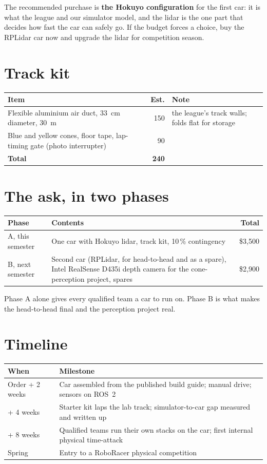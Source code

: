 \documentclass[11pt,a4paper]{article}
\begin{document}
\medskip
The recommended purchase is \textbf{the Hokuyo configuration} for the first car: it is what
the league and our simulator model, and the lidar is the one part that decides how fast the
car can safely go. If the budget forces a choice, buy the RPLidar car now and upgrade the lidar
for competition season.

\section{Track kit}

\begin{tabularx}{\linewidth}{Xrl}
\toprule
Item & Est. & Note \\
\midrule
Flexible aluminium air duct, 33~cm diameter, 30~m & 150 & the league's track walls; folds flat for storage \\
Blue and yellow cones, floor tape, lap-timing gate (photo interrupter) & 90 & \\
\midrule
\textbf{Total} & \textbf{240} & \\
\bottomrule
\end{tabularx}

\section{The ask, in two phases}

\begin{tabularx}{\linewidth}{lXr}
\toprule
Phase & Contents & Total \\
\midrule
A, this semester & One car with Hokuyo lidar, track kit, 10\,\% contingency & \$3{,}500 \\
B, next semester & Second car (RPLidar, for head-to-head and as a spare), Intel RealSense D435i depth camera for the cone-perception project, spares & \$2{,}900 \\
\bottomrule
\end{tabularx}

\medskip
Phase A alone gives every qualified team a car to run on. Phase B is what makes the
head-to-head final and the perception project real.

\section{Timeline}

\begin{tabularx}{\linewidth}{lX}
\toprule
When & Milestone \\
\midrule
Order + 2 weeks & Car assembled from the published build guide; manual drive; sensors on ROS~2 \\
+ 4 weeks & Starter kit laps the lab track; simulator-to-car gap measured and written up \\
+ 8 weeks & Qualified teams run their own stacks on the car; first internal physical time-attack \\
Spring & Entry to a RoboRacer physical competition \\
\bottomrule
\end{tabularx}
\end{document}
